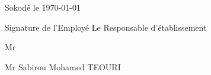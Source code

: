 \documentclass[a4paper, 12pt]{article}
\begin{document}
\begin{flushright}
Sokodé le \today
\end{flushright}\vspace{2mm}



Signature de l'Employé \hspace{6.3cm}  Le Responsable d'établissement


\vspace{3cm}


\begin{minipage}[t]{0.5\textwidth} %
  \raggedright %
  Mr  
  \end{minipage} %
  \hfill %
  \begin{minipage}[t]{0.4\textwidth} %
  \raggedleft %
  Mr Sabirou Mohamed TEOURI
    
  \end{minipage} %
\end{document}
